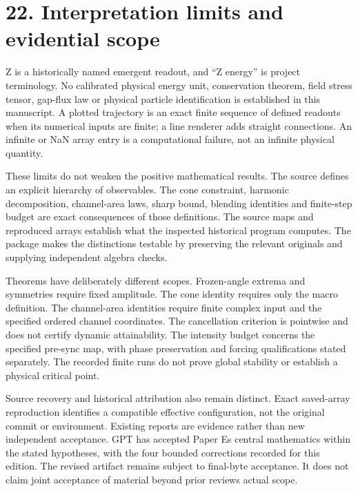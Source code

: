 \documentclass[
  11pt,
  a4paper,
]{article}
\begin{document}
\section{22. Interpretation limits and evidential scope}\label{interpretation-limits-and-evidential-scope}

Z is a historically named emergent readout, and ``Z energy'' is project terminology. No calibrated physical energy unit, conservation theorem, field stress tensor, gap-flux law or physical particle identification is established in this manuscript. A plotted trajectory is an exact finite sequence of defined readouts when its numerical inputs are finite; a line renderer adds straight connections. An infinite or NaN array entry is a computational failure, not an infinite physical quantity.

These limits do not weaken the positive mathematical results. The source defines an explicit hierarchy of observables. The cone constraint, harmonic decomposition, channel-area laws, sharp bound, blending identities and finite-step budget are exact consequences of those definitions. The source maps and reproduced arrays establish what the inspected historical program computes. The package makes the distinctions testable by preserving the relevant originals and supplying independent algebra checks.

Theorems have deliberately different scopes. Frozen-angle extrema and symmetries require fixed amplitude. The cone identity requires only the macro definition. The channel-area identities require finite complex input and the specified ordered channel coordinates. The cancellation criterion is pointwise and does not certify dynamic attainability. The intensity budget concerns the specified pre-sync map, with phase preservation and forcing qualifications stated separately. The recorded finite runs do not prove global stability or establish a physical critical point.

Source recovery and historical attribution also remain distinct. Exact saved-array reproduction identifies a compatible effective configuration, not the original commit or environment. Existing reports are evidence rather than new independent acceptance. GPT has accepted Paper E\textquotesingle s central mathematics within the stated hypotheses, with the four bounded corrections recorded for this edition. The revised artifact remains subject to final-byte acceptance. It does not claim joint acceptance of material beyond prior reviews\textquotesingle{} actual scope.
\end{document}
